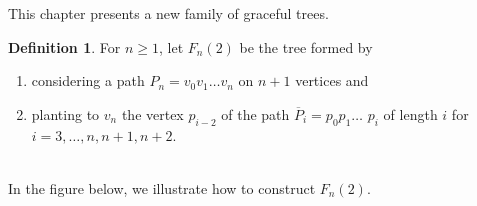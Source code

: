 \documentclass[12pt]{report}
\theoremstyle{definition}
\newtheorem{define}{\indent Definition}[chapter]
\def\indent{\hspace*{.5cm}}
\begin{document}
This chapter presents a new family of graceful trees. \bigskip
\begin{define}
    For $n\geq1$, let  $F_{n}\left ( 2 \right )$ be the tree formed by \begin{enumerate}
    	\item considering a path  $P_{n}=v_{0}v_{1}$$\ldots$$v_{n}$ on $n+1$ vertices and
    	\item planting to $v_{n}$ the vertex $p_{i-2}$ of the path $\overline{P}_{i}=p_{0}p_{1}\ldots$ $p_{i}$ of length $i$ for $i=3,\ldots,n,n+1,n+2$.
    
	\end{enumerate}
\end{define}\\

In the figure below, we illustrate how to construct $F_{n}(2)$.
\end{document}
